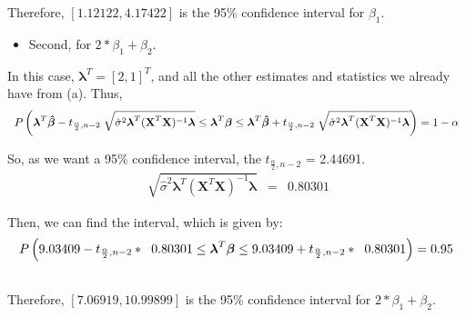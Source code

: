 \documentclass[a4paper, 11pt]{article}
\begin{document}
Therefore, $\left[ 1.12122, 4.17422 \right]$ is the 95\% confidence interval for $\beta_1$.

\begin{itemize}
\item Second, for $2*\beta_1 + \beta_2$.
\end{itemize}

In this case, $\boldsymbol{\lambda}^T = [2, 1]^T$, and all the other estimates and statistics we already have from (a). Thus,
\begin{equation*}
\begin{array}{lclllll}
P\left( \boldsymbol{\lambda}^T\boldsymbol{\hat{\beta}} - t_{\frac{\alpha}{2}, n-2} \hspace{0.2cm} \displaystyle\sqrt[]{\hat{\sigma}^2 \boldsymbol{\lambda}^T (\textbf{X}^T \textbf{X})^{-1} \boldsymbol{\lambda}} \leq \boldsymbol{\lambda}^T\boldsymbol{\beta} \leq \boldsymbol{\lambda}^T\boldsymbol{\hat{\beta}} + t_{\frac{\alpha}{2}, n-2} \hspace{0.2cm} \displaystyle\sqrt[]{\hat{\sigma}^2 \boldsymbol{\lambda}^T (\textbf{X}^T \textbf{X})^{-1} \boldsymbol{\lambda}} \right) = 1 - \alpha
\end{array}
\end{equation*}

So, as we want a 95\% confidence interval, the $ t_{\frac{\alpha}{2}, n-2}$ = 2.44691.
\begin{equation*}
\begin{array}{lclllll}
\displaystyle\sqrt[]{\hat{\sigma}^2 \boldsymbol{\lambda}^T (\textbf{X}^T \textbf{X})^{-1} \boldsymbol{\lambda}} & = & 0.80301
\end{array}
\end{equation*}

Then, we can find the interval, which is given by:
\begin{equation*}
\begin{array}{lclllll}
P\left( 9.03409 - t_{\frac{\alpha}{2}, n-2} * \hspace{0.2cm} 0.80301 \leq \boldsymbol{\lambda}^T\boldsymbol{\beta} \leq 9.03409 + t_{\frac{\alpha}{2}, n-2} * \hspace{0.2cm} 0.80301 \right) = 0.95 \\ \\
\end{array}
\end{equation*}

Therefore, $\left[ 7.06919, 10.99899 \right]$ is the 95\% confidence interval for $2*\beta_1 + \beta_2$.
\end{document}
